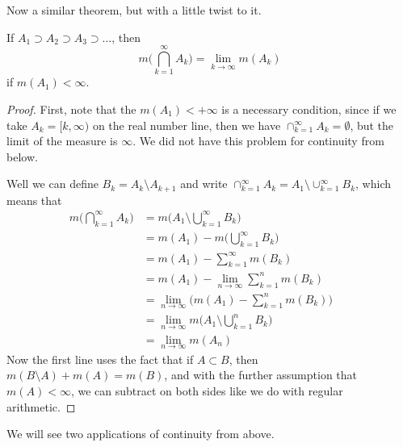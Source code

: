   Now a similar theorem, but with a little twist to it. 

  \begin{theorem}
    If $A_1 \supset A_2 \supset A_3 \supset \ldots$, then 
    \begin{equation}
      m\bigg( \bigcap_{k=1}^\infty A_k \bigg) = \lim_{k \rightarrow \infty} m(A_k)
    \end{equation}
    if $m(A_1) < \infty$. 
  \end{theorem}
  \begin{proof}
    First, note that the $m(A_1) < +\infty$ is a necessary condition, since if we take $A_k = [k, \infty)$ on the real number line, then we have $\cap_{k=1}^\infty A_k = \emptyset$, but the limit of the measure is $\infty$. We did not have this problem for continuity from below. 

    Well we can define $B_k = A_k \setminus A_{k+1}$ and write $\cap_{k=1}^\infty A_k = A_1 \setminus \cup_{k=1}^\infty B_k$, which means that 
    \begin{align}
      m\bigg( \bigcap_{k=1}^\infty A_k \bigg) 
        & = m\bigg( A_1 \setminus \bigcup_{k=1}^\infty B_k \bigg) \\
        & = m(A_1) - m\bigg( \bigcup_{k=1}^\infty B_k\bigg) && \tag{Excision} \\
        & = m(A_1) - \sum_{k=1}^\infty m(B_k) && \tag{Countable Additivity} \\
        & = m(A_1) - \lim_{n \rightarrow \infty} \sum_{k=1}^n m(B_k) && \tag{Definition of Series} \\
        & = \lim_{n \rightarrow \infty} \bigg( m(A_1) - \sum_{k=1}^n m(B_k) \bigg) \\
        & = \lim_{n \rightarrow \infty} m \bigg( A_1 \setminus \bigcup_{k=1}^n B_k \bigg) && \tag{Excision} \\ 
        & = \lim_{n \rightarrow \infty} m(A_n) 
    \end{align}
    Now the first line uses the fact that if $A \subset B$, then $m(B \setminus A) + m(A) = m(B)$, and with the further assumption that $m(A) < \infty$, we can subtract on both sides like we do with regular arithmetic. 
  \end{proof}

  We will see two applications of continuity from above. 

